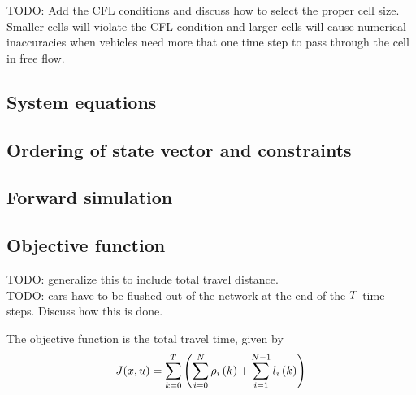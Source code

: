 TODO: Add the CFL conditions and discuss how to select the proper cell size. Smaller cells will violate the CFL condition and larger cells will cause numerical inaccuracies when vehicles need more that one time step to pass through the cell in free flow. 





\subsection{System equations}



\subsection{Ordering of state vector and constraints}




\subsection{Forward simulation}


\subsection{Objective function}
TODO: generalize this to include total travel distance.\\
TODO: cars have to be flushed out of the network at the end of the $T$ time steps. Discuss how this is done.

The objective function is the total travel time, given by
\[
J(x, u) = \sum_{k = 0}^{T} \left( \sum_{i = 0}^{N} \rho_{i}\left(k\right) + \sum_{i = 1}^{N - 1} l_{i}\left(k\right) \right)
\]


